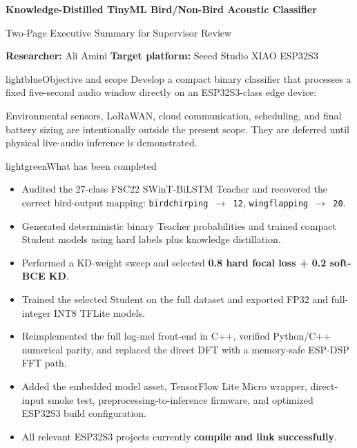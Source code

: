 \documentclass[10pt,a4paper]{article}
\begin{document}
{\Large\bfseries\color{navy} Knowledge-Distilled TinyML Bird/Non-Bird Acoustic Classifier}\par
{\large Two-Page Executive Summary for Supervisor Review}\par
\vspace{2pt}
\textbf{Researcher:} Ali Amini \hfill \textbf{Target platform:} Seeed Studio XIAO ESP32S3

\begin{summarybox}{lightblue}{Objective and scope}
Develop a compact binary classifier that processes a fixed five-second audio window directly on an ESP32S3-class edge device:
\begin{center}
\end{center}
Environmental sensors, LoRaWAN, cloud communication, scheduling, and final battery sizing are intentionally outside the present scope. They are deferred until physical live-audio inference is demonstrated.
\end{summarybox}

\begin{summarybox}{lightgreen}{What has been completed}
\begin{itemize}
  \item Audited the 27-class FSC22 SWinT-BiLSTM Teacher and recovered the correct bird-output mapping: \texttt{birdchirping $\rightarrow$ 12}, \texttt{wingflapping $\rightarrow$ 20}.
  \item Generated deterministic binary Teacher probabilities and trained compact Student models using hard labels plus knowledge distillation.
  \item Performed a KD-weight sweep and selected \textbf{0.8 hard focal loss + 0.2 soft-BCE KD}.
  \item Trained the selected Student on the full dataset and exported FP32 and full-integer INT8 TFLite models.
  \item Reimplemented the full log-mel front-end in C++, verified Python/C++ numerical parity, and replaced the direct DFT with a memory-safe ESP-DSP FFT path.
  \item Added the embedded model asset, TensorFlow Lite Micro wrapper, direct-input smoke test, preprocessing-to-inference firmware, and optimized ESP32S3 build configuration.
  \item All relevant ESP32S3 projects currently \textbf{compile and link successfully}.
\end{itemize}
\end{summarybox}
\end{document}

